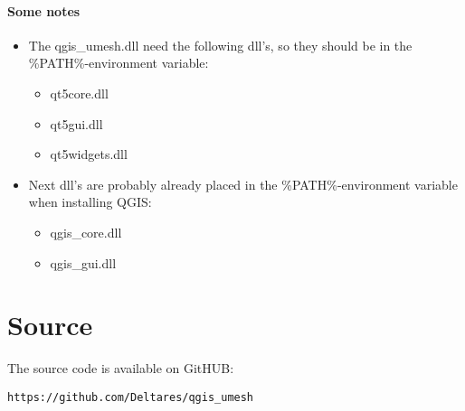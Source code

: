 \documentclass{deltares_memo}
\newcommand{\qumesh}{qgis\_umesh\xspace}
\begin{document}
\paragraph*{Some notes}
\phantom{mooiman}\vspace{-\baselineskip}
\begin{itemize}
\item The \qumesh.dll need the following dll's, so they should be in the \%PATH\%-environment variable:
\begin{itemize}
    \item qt5core.dll
    \item qt5gui.dll
    \item qt5widgets.dll
\end{itemize}

\item Next dll's are probably already placed in the \%PATH\%-environment variable when installing QGIS:
\begin{itemize} 
    \item qgis\_core.dll
    \item qgis\_gui.dll
\end{itemize} 
\end{itemize}
\section{Source}
The source code is available on GitHUB:
\begin{Verbatim}
https://github.com/Deltares/qgis_umesh
\end{Verbatim}
\end{document}
